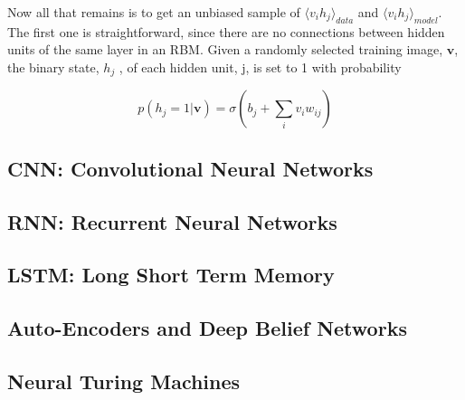 Now all that remains is to get an unbiased sample of $\langle v_{i} h_{j} \rangle_{data}$ and $\langle v_{i} h_{j} \rangle_{model}$. The first one is straightforward, since there are no connections between hidden units of the same layer in an RBM. Given a randomly selected training image, $\textbf{v}$, the binary state, $h_{j}$ , of each hidden unit, j, is set to 1 with probability 

\begin{equation}
p(h_{j}=1 | \textbf{v}) = \sigma ( b_{j} + \sum_{i} v_{i} w_{ij} )
\end{equation}

\subsection{CNN: Convolutional Neural Networks}

\subsection{RNN: Recurrent Neural Networks}

\subsection{LSTM: Long Short Term Memory}

\subsection{Auto-Encoders and Deep Belief Networks}

\subsection{Neural Turing Machines}
